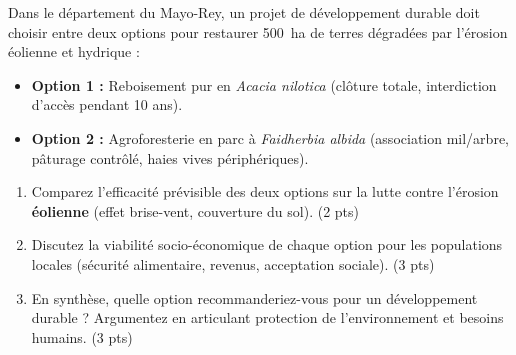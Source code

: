 \documentclass[11pt]{article}
\begin{document}
\begin{exercice}
Dans le département du Mayo-Rey, un projet de développement durable doit choisir entre deux options pour restaurer \SI{500}{\hectare} de terres dégradées par l'érosion éolienne et hydrique :
\begin{itemize}
    \item \textbf{Option 1 :} Reboisement pur en \textit{Acacia nilotica} (clôture totale, interdiction d'accès pendant 10 ans).
    \item \textbf{Option 2 :} Agroforesterie en parc à \textit{Faidherbia albida} (association mil/arbre, pâturage contrôlé, haies vives périphériques).
\end{itemize}
\begin{enumerate}
    \item Comparez l'efficacité prévisible des deux options sur la lutte contre l'érosion \textbf{éolienne} (effet brise-vent, couverture du sol). (2 pts)
    \item Discutez la viabilité socio-économique de chaque option pour les populations locales (sécurité alimentaire, revenus, acceptation sociale). (3 pts)
    \item En synthèse, quelle option recommanderiez-vous pour un développement durable ? Argumentez en articulant protection de l'environnement et besoins humains. (3 pts)
\end{enumerate}
\end{exercice}
\end{document}
